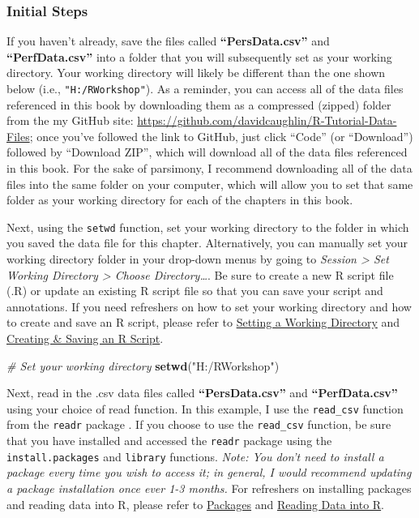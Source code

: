 \documentclass[]{book}
\newenvironment{Shaded}{\begin{snugshade}}{\end{snugshade}}
\newcommand{\KeywordTok}[1]{\textcolor[rgb]{0.13,0.29,0.53}{\textbf{#1}}}
\newcommand{\StringTok}[1]{\textcolor[rgb]{0.31,0.60,0.02}{#1}}
\newcommand{\CommentTok}[1]{\textcolor[rgb]{0.56,0.35,0.01}{\textit{#1}}}
\newcommand{\NormalTok}[1]{#1}
\begin{document}
\hypertarget{initsteps_join}{\subsubsection{Initial
Steps}\label{initsteps_join}}

If you haven't already, save the files called \textbf{``PersData.csv''}
and \textbf{``PerfData.csv''} into a folder that you will subsequently
set as your working directory. Your working directory will likely be
different than the one shown below (i.e., \texttt{"H:/RWorkshop"}). As a
reminder, you can access all of the data files referenced in this book
by downloading them as a compressed (zipped) folder from the my GitHub
site: \url{https://github.com/davidcaughlin/R-Tutorial-Data-Files}; once
you've followed the link to GitHub, just click ``Code'' (or
``Download'') followed by ``Download ZIP'', which will download all of
the data files referenced in this book. For the sake of parsimony, I
recommend downloading all of the data files into the same folder on your
computer, which will allow you to set that same folder as your working
directory for each of the chapters in this book.

Next, using the \texttt{setwd} function, set your working directory to
the folder in which you saved the data file for this chapter.
Alternatively, you can manually set your working directory folder in
your drop-down menus by going to \emph{Session \textgreater{} Set
Working Directory \textgreater{} Choose Directory\ldots{}}. Be sure to
create a new R script file (.R) or update an existing R script file so
that you can save your script and annotations. If you need refreshers on
how to set your working directory and how to create and save an R
script, please refer to \protect\hyperlink{setwd}{Setting a Working
Directory} and \protect\hyperlink{createRscript}{Creating \& Saving an R
Script}.

\begin{Shaded}
\begin{Highlighting}[]
\CommentTok{# Set your working directory}
\KeywordTok{setwd}\NormalTok{(}\StringTok{"H:/RWorkshop"}\NormalTok{)}
\end{Highlighting}
\end{Shaded}

Next, read in the .csv data files called \textbf{``PersData.csv''} and
\textbf{``PerfData.csv''} using your choice of read function. In this
example, I use the \texttt{read\_csv} function from the \texttt{readr}
package \citep{R-readr}. If you choose to use the \texttt{read\_csv}
function, be sure that you have installed and accessed the
\texttt{readr} package using the \texttt{install.packages} and
\texttt{library} functions. \emph{Note: You don't need to install a
package every time you wish to access it; in general, I would recommend
updating a package installation once ever 1-3 months.} For refreshers on
installing packages and reading data into R, please refer to
\protect\hyperlink{packages}{Packages} and
\protect\hyperlink{read}{Reading Data into R}.
\end{document}
